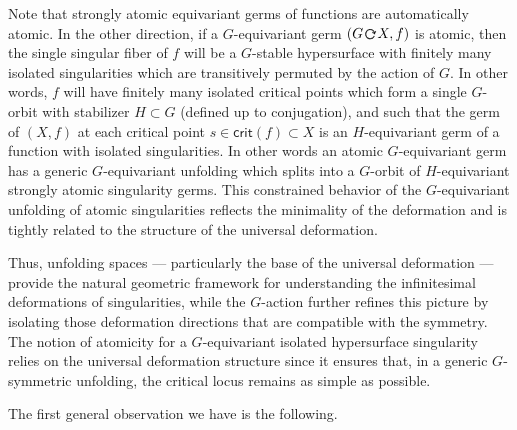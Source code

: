 \documentclass[twoside,leqno]{article}
\numberwithin{equation}{section}
\theoremstyle{plain}
\theoremstyle{definition}
\begin{document}
Note that strongly atomic equivariant germs of functions are automatically atomic.
In the other direction, if a  $G$-equivariant germ  $(G\, \actleft\, X,f)$ is atomic, then the single singular fiber of $f$ will be a $G$-stable hypersurface with finitely many isolated singularities which are transitively permuted by the action of $G$. In other words, $f$ will have finitely many isolated critical points which form a single $G$-orbit with stabilizer $H \subset G$ (defined up to conjugation), and such that 
the germ of $(X,f)$ at each critical point $s \in \mathsf{crit}(f) \subset X$ is an $H$-equivariant germ of a function with isolated singularities. In other words an atomic $G$-equivariant germ has a generic $G$-equivariant unfolding which splits into a $G$-orbit of $H$-equivariant strongly atomic singularity germs. This constrained behavior of the $G$-equivariant unfolding of atomic singularities reflects the minimality of the deformation and is tightly related to the structure of the universal deformation.

Thus, unfolding spaces — particularly  the base of the universal deformation — provide the natural geometric framework for understanding the infinitesimal deformations of singularities, while the \(G\)-action further refines this picture by isolating those deformation directions that are compatible with the symmetry. The notion of atomicity for a \(G\)-equivariant isolated hypersurface singularity relies on the universal deformation structure since it ensures that, in a generic \(G\)-symmetric unfolding, the critical locus remains as simple as possible.

\medskip
The first general observation we have is the following.
\end{document}
